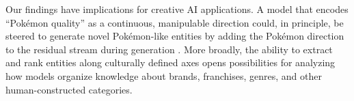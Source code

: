 Our findings have implications for creative AI applications. A model that encodes ``Pok\'{e}mon quality'' as a continuous, manipulable direction could, in principle, be steered to generate novel Pok\'{e}mon-like entities by adding the Pok\'{e}mon direction to the residual stream during generation \citep{turner2023activation}. More broadly, the ability to extract and rank entities along culturally defined axes opens possibilities for analyzing how models organize knowledge about brands, franchises, genres, and other human-constructed categories.